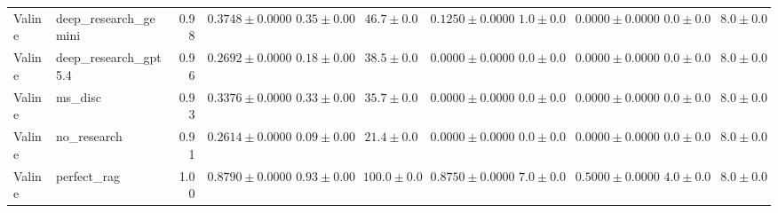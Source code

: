 \begin{table}[htbp]
\begin{tabular}{llrrrrrrrrr}
Valine & deep_research_gemini & 0.98 & $0.3748 \pm 0.0000$ & $0.35 \pm 0.00$ & $46.7 \pm 0.0$ & $0.1250 \pm 0.0000$ & $1.0 \pm 0.0$ & $0.0000 \pm 0.0000$ & $0.0 \pm 0.0$ & $8.0 \pm 0.0$ \\
Valine & deep_research_gpt5.4 & 0.96 & $0.2692 \pm 0.0000$ & $0.18 \pm 0.00$ & $38.5 \pm 0.0$ & $0.0000 \pm 0.0000$ & $0.0 \pm 0.0$ & $0.0000 \pm 0.0000$ & $0.0 \pm 0.0$ & $8.0 \pm 0.0$ \\
Valine & ms_disc & 0.93 & $0.3376 \pm 0.0000$ & $0.33 \pm 0.00$ & $35.7 \pm 0.0$ & $0.0000 \pm 0.0000$ & $0.0 \pm 0.0$ & $0.0000 \pm 0.0000$ & $0.0 \pm 0.0$ & $8.0 \pm 0.0$ \\
Valine & no_research & 0.91 & \cellcolor{red!25}$0.2614 \pm 0.0000$ & $0.09 \pm 0.00$ & $21.4 \pm 0.0$ & $0.0000 \pm 0.0000$ & $0.0 \pm 0.0$ & $0.0000 \pm 0.0000$ & $0.0 \pm 0.0$ & $8.0 \pm 0.0$ \\
Valine & perfect_rag & 1.00 & \cellcolor{green!25}$0.8790 \pm 0.0000$ & $0.93 \pm 0.00$ & $100.0 \pm 0.0$ & $0.8750 \pm 0.0000$ & $7.0 \pm 0.0$ & $0.5000 \pm 0.0000$ & $4.0 \pm 0.0$ & $8.0 \pm 0.0$ \\
\bottomrule
\end{tabular}
\end{table}